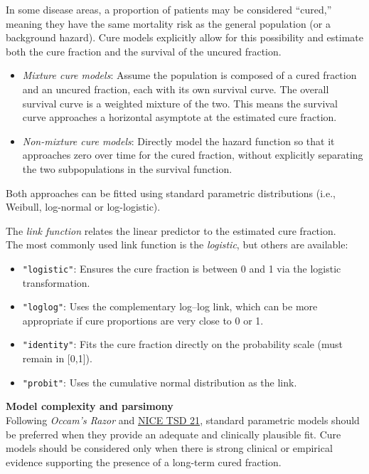 \documentclass[
]{article}
\providecommand{\tightlist}{%
  \setlength{\itemsep}{0pt}\setlength{\parskip}{0pt}}
\begin{document}
In some disease areas, a proportion of patients may be considered
``cured,'' meaning they have the same mortality risk as the general
population (or a background hazard). Cure models explicitly allow for
this possibility and estimate both the cure fraction and the survival of
the uncured fraction.

\begin{itemize}
\tightlist
\item
  \emph{Mixture cure models}: Assume the population is composed of a
  cured fraction and an uncured fraction, each with its own survival
  curve. The overall survival curve is a weighted mixture of the two.
  This means the survival curve approaches a horizontal asymptote at the
  estimated cure fraction.\\
\item
  \emph{Non-mixture cure models}: Directly model the hazard function so
  that it approaches zero over time for the cured fraction, without
  explicitly separating the two subpopulations in the survival function.
\end{itemize}

Both approaches can be fitted using standard parametric distributions
(i.e., Weibull, log-normal or log-logistic).

The \emph{link function} relates the linear predictor to the estimated
cure fraction.\\
The most commonly used link function is the \emph{logistic}, but others
are available:

\begin{itemize}
\tightlist
\item
  \texttt{"logistic"}: Ensures the cure fraction is between 0 and 1 via
  the logistic transformation.\\
\item
  \texttt{"loglog"}: Uses the complementary log--log link, which can be
  more appropriate if cure proportions are very close to 0 or 1.\\
\item
  \texttt{"identity"}: Fits the cure fraction directly on the
  probability scale (must remain in {[}0,1{]}).\\
\item
  \texttt{"probit"}: Uses the cumulative normal distribution as the
  link.
\end{itemize}

\textbf{Model complexity and parsimony}\\
Following \emph{Occam's Razor} and
\href{https://www.sheffield.ac.uk/media/34188/download?attachment}{NICE
TSD 21}, standard parametric models should be preferred when they
provide an adequate and clinically plausible fit. Cure models should be
considered only when there is strong clinical or empirical evidence
supporting the presence of a long-term cured fraction.
\end{document}
